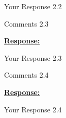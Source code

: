 \documentclass{article}
\begin{document}
Your Response 2.2

\vspace{0.3cm}


\begin{cmt}{}{}

Comments 2.3

\end{cmt}
\vspace{0.1cm}
\noindent
\underline{\textbf{Response:}}
\vspace{0.2cm}

Your Response 2.3

\vspace{0.3cm}


\begin{cmt}{}{}

Comments 2.4

\end{cmt}
\vspace{0.1cm}
\noindent
\underline{\textbf{Response:}}
\vspace{0.2cm}

Your Response 2.4

\vspace{0.3cm}
\end{document}
